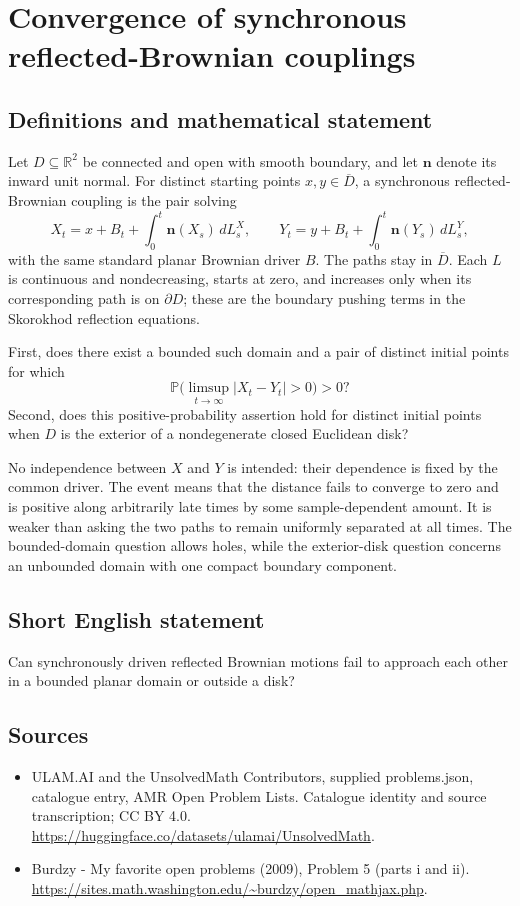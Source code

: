 \documentclass[11pt,a4paper]{article}
\begin{document}
\section*{Convergence of synchronous reflected-Brownian couplings}\label{statement}

\subsection{Definitions and mathematical statement}
Let $D\subseteq\mathbb R^2$ be connected and open with smooth boundary, and let $\mathbf n$ denote its inward unit normal. For distinct starting points $x,y\in\overline D$, a synchronous reflected-Brownian coupling is the pair solving
\[
X_t=x+B_t+\int_0^t\mathbf n(X_s)\,dL_s^X,
\qquad
Y_t=y+B_t+\int_0^t\mathbf n(Y_s)\,dL_s^Y,
\]
with the same standard planar Brownian driver $B$. The paths stay in $\overline D$. Each $L$ is continuous and nondecreasing, starts at zero, and increases only when its corresponding path is on $\partial D$; these are the boundary pushing terms in the Skorokhod reflection equations.

First, does there exist a bounded such domain and a pair of distinct initial points for which
\[
\mathbb P\bigl(\limsup_{t\to\infty}|X_t-Y_t|>0\bigr)>0?
\]
Second, does this positive-probability assertion hold for distinct initial points when $D$ is the exterior of a nondegenerate closed Euclidean disk?

No independence between $X$ and $Y$ is intended: their dependence is fixed by the common driver. The event means that the distance fails to converge to zero and is positive along arbitrarily late times by some sample-dependent amount. It is weaker than asking the two paths to remain uniformly separated at all times. The bounded-domain question allows holes, while the exterior-disk question concerns an unbounded domain with one compact boundary component.
\subsection{Short English statement}
Can synchronously driven reflected Brownian motions fail to approach each other in a bounded planar domain or outside a disk?
\subsection{Sources}
\begin{itemize}
\item[S1] ULAM.AI and the UnsolvedMath Contributors, supplied problems.json, catalogue entry, AMR Open Problem Lists. Catalogue identity and source transcription; CC BY 4.0.
\url{https://huggingface.co/datasets/ulamai/UnsolvedMath}.
\item[S2] Burdzy - My favorite open problems (2009), Problem 5 (parts i and ii). 
\url{https://sites.math.washington.edu/~burdzy/open_mathjax.php}.
\end{itemize}
\end{document}

